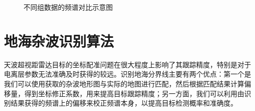 \begin{figure}[H]
	\centering
	\hfil

	\hfil
	\caption{不同组数据的频谱对比示意图}
	\label{fig:group}
\end{figure}

\section{地海杂波识别算法}
天波超视距雷达目标的坐标配准问题在很大程度上影响了其跟踪精度，特别是对于电离层参数无法准确及时获得的较远。识别地海分界线主要有两个优点：第一个是我们可以使用获取的杂波地形图与实际的地图进行匹配，然后根据匹配结果计算偏移量，得到坐标修正系数，用来提高目标跟踪精度；另一方面，我们可以利用由识别结果获得的频谱上的偏移来校正频谱本身，以提高目标检测概率和准确度。

